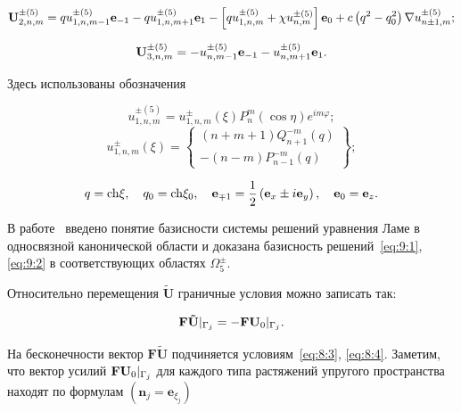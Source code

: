 \begin{equation}
{\bf{U}}_{2,n,m}^{ \pm (5)} = qu_{1,n,m - 1}^{ \pm (5)}{{\bf{e}}_{ - 1}} - qu_{1,n,m + 1}^{ \pm (5)}{{\bf{e}}_1} - \left[ {qu_{1,n,m}^{ \pm (5)} + \chi u_{n,m}^{ \pm (5)}} \right]{{\bf{e}}_0} + c\left( {{q^2} - q_0^2} \right)\nabla u_{n \pm 1,m}^{ \pm (5)};
\end{equation}

\begin{equation}
{\bf{U}}_{3,n,m}^{ \pm (5)} =  - u_{n,m - 1}^{ \pm (5)}{{\bf{e}}_{ - 1}} - u_{n,m + 1}^{ \pm (5)}{{\bf{e}}_1}.
\end{equation}

Здесь использованы обозначения
	
\begin{equation}
u_{1,n,m}^{ \pm (5)} = u_{1,n,m}^ \pm (\xi )P_n^m(\cos \eta ){e^{im\varphi }};
\end{equation}
\begin{equation}
u_{1,n,m}^ \pm (\xi ) = \left\{ \begin{array}{l}
(n + m + 1)Q_{n + 1}^{ - m}(q)\\
 - (n - m)P_{n - 1}^{ - m}(q)
\end{array} \right\};
\end{equation}

\begin{equation}
q = {\mathop{\rm ch}\nolimits} \xi ,\quad {q_0} = {\mathop{\rm ch}\nolimits} {\xi _0},\quad {{\bf{e}}_{ \mp 1}} = \frac{1}{2}\left( {{{\bf{e}}_x} \pm i{{\bf{e}}_y}} \right),\quad {{\bf{e}}_0} = {{\bf{e}}_z}.
\end{equation}

В работе~\cite{Nikolaev1998} введено понятие базисности системы решений уравнения Ламе в односвязной канонической области и доказана базисность решений~\eqref{eq:9:1}, \eqref{eq:9:2} в соответствующих областях $\Omega_5^\pm$.{\sloppy\par}

Относительно перемещения $\mathbf{\tilde U}$ граничные условия можно записать так:

\begin{equation}
{\bf{F\tilde U}}{|_{{\Gamma _j}}} =  - {\bf{F}}{{\bf{U}}_0}{|_{{\Gamma _j}}}.
\end{equation}

На бесконечности вектор $\mathbf{F\tilde U}$ подчиняется условиям~\eqref{eq:8:3}, \eqref{eq:8:4}. Заметим, что вектор усилий ${\bf{F}}{{\bf{U}}_0}{|_{{\Gamma _j}}}$ для каждого типа растяжений упругого пространства находят по формулам $(\mathbf{n}_j=\mathbf{e}_{\xi_j})$

